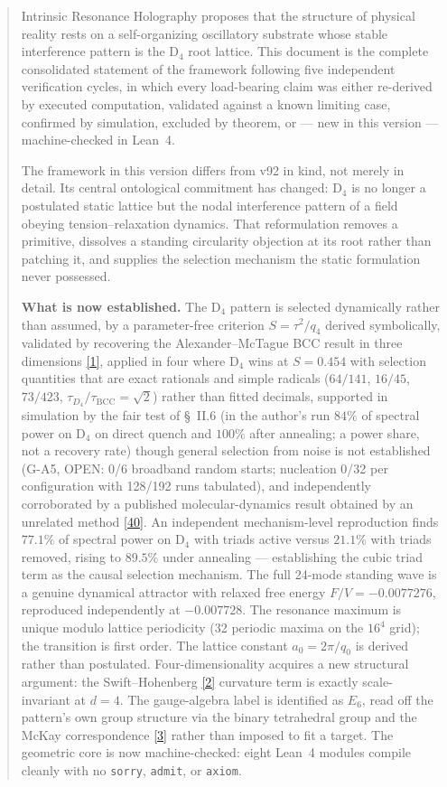 \documentclass[a4paper,11pt]{article}
\begin{document}
\begin{abstract}
Intrinsic Resonance Holography proposes that the structure of physical reality rests on a self-organizing oscillatory substrate whose stable interference pattern is the D$_4$ root lattice. This document is the complete consolidated statement of the framework following five independent verification cycles, in which every load-bearing claim was either re-derived by executed computation, validated against a known limiting case, confirmed by simulation, excluded by theorem, or --- new in this version --- machine-checked in Lean~4.

The framework in this version differs from v92 in kind, not merely in detail. Its central ontological commitment has changed: D$_4$ is no longer a postulated static lattice but the nodal interference pattern of a field obeying tension--relaxation dynamics. That reformulation removes a primitive, dissolves a standing circularity objection at its root rather than patching it, and supplies the selection mechanism the static formulation never possessed.

\textbf{What is now established.} The D$_4$ pattern is selected dynamically rather than assumed, by a parameter-free criterion $S=\tau^2/q_4$ derived symbolically, validated by recovering the Alexander--McTague BCC result in three dimensions \hyperref[ref1]{[1]}, applied in four where D$_4$ wins at $S=0.454$ with selection quantities that are exact rationals and simple radicals ($64/141$, $16/45$, $73/423$, $\tau_{D_4}/\tau_{\mathrm{BCC}}=\sqrt{2}$) rather than fitted decimals, supported in simulation by the fair test of \S~II.6 (in the author's run $84\%$ of spectral power on D$_4$ on direct quench and $100\%$ after annealing; a power share, not a recovery rate) though general selection from noise is not established (G-A5, OPEN: 0/6 broadband random starts; nucleation 0/32 per configuration with 128/192 runs tabulated), and independently corroborated by a published molecular-dynamics result obtained by an unrelated method \hyperref[ref40]{[40]}. An independent mechanism-level reproduction finds $77.1\%$ of spectral power on D$_4$ with triads active versus $21.1\%$ with triads removed, rising to $89.5\%$ under annealing --- establishing the cubic triad term as the causal selection mechanism. The full 24-mode standing wave is a genuine dynamical attractor with relaxed free energy $F/V=-0.0077276$, reproduced independently at $-0.007728$. The resonance maximum is unique modulo lattice periodicity (32 periodic maxima on the $16^4$ grid); the transition is first order. The lattice constant $a_0=2\pi/q_0$ is derived rather than postulated. Four-dimensionality acquires a new structural argument: the Swift--Hohenberg \hyperref[ref2]{[2]} curvature term is exactly scale-invariant at $d=4$. The gauge-algebra label is identified as $E_6$, read off the pattern's own group structure via the binary tetrahedral group and the McKay correspondence \hyperref[ref3]{[3]} rather than imposed to fit a target. The geometric core is now machine-checked: eight Lean~4 modules compile cleanly with no \texttt{sorry}, \texttt{admit}, or \texttt{axiom}.


\end{abstract}
\end{document}
